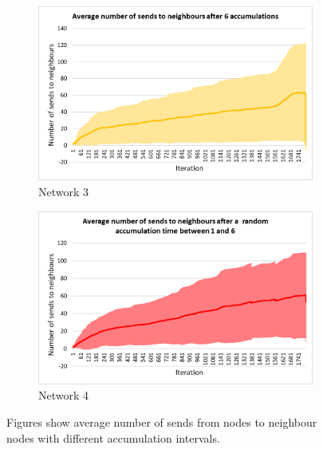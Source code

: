 \documentclass[USenglish]{uit-thesis}
\begin{document}
\begin{figure}
\begin{subfigure}[b]{0.475\textwidth}
            \includegraphics[width=\textwidth]{numSends_stdev_6.png}
            \caption[]%
            {{\small Network 3}}    
            \label{fig:sendfig3}
        \end{subfigure}
        \quad
        \begin{subfigure}[b]{0.475\textwidth}   
            \centering 
            \includegraphics[width=\textwidth]{numSends_stdev_rand.png}
            \caption[]%
            {{\small Network 4}}    
            \label{fig:sendfig4}
        \end{subfigure}
        \caption[Figures show average number of sends from nodes to neighbour nodes with different accumulation intervals.]
        {\small Figures show average number of sends from nodes to neighbour nodes with different accumulation intervals.} 
        \label{fig:sendsChart}
    \end{figure}
\end{document}
